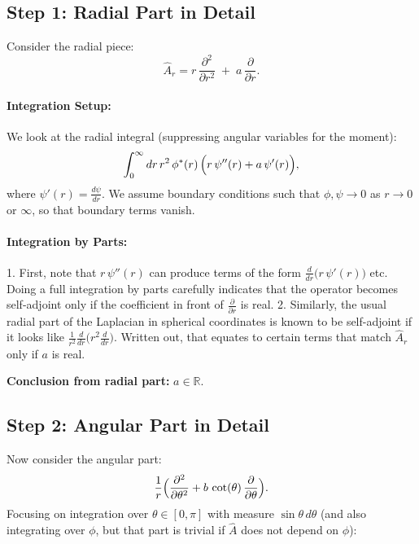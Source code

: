 \documentclass[12pt]{article}
\begin{document}
\subsection*{Step 1: Radial Part in Detail}
Consider the radial piece:
\begin{equation}
\hat{A}_r = r\,\frac{\partial^2}{\partial r^2} \;+\; a\,\frac{\partial}{\partial r}.
\end{equation}

\paragraph{Integration Setup:}
We look at the radial integral (suppressing angular variables for the moment):
\[
\int_0^{\infty} dr\, r^2\,\phi^*(r)\,\Bigl(r\,\psi''(r) + a\,\psi'(r)\Bigr),
\]
where \(\psi'(r) = \tfrac{d\psi}{dr}\). We assume boundary conditions such that \(\phi,\psi\to 0\) as \(r\to0\) or \(\infty\), so that boundary terms vanish.

\paragraph{Integration by Parts:}
1. First, note that \(r\,\psi''(r)\) can produce terms of the form \(\frac{d}{dr}\bigl(r\,\psi'(r)\bigr)\) etc. Doing a full integration by parts carefully indicates that the operator becomes self-adjoint only if the coefficient in front of \(\tfrac{\partial}{\partial r}\) is real.
2. Similarly, the usual radial part of the Laplacian in spherical coordinates is known to be self-adjoint if it looks like \(\frac{1}{r^2}\frac{d}{dr}\bigl(r^2\frac{d}{dr}\bigr)\). Written out, that equates to certain terms that match \(\hat{A}_r\) only if \(a\) is real.

\textbf{Conclusion from radial part:} \(a \in \mathbb{R}\).

\subsection*{Step 2: Angular Part in Detail}
Now consider the angular part:
\begin{equation}
\frac{1}{r}\Bigl(\frac{\partial^2}{\partial \theta^2} + b\,\cot(\theta)\,\frac{\partial}{\partial \theta}\Bigr).
\end{equation}
Focusing on integration over \(\theta\in[0,\pi]\) with measure \(\sin\theta\,d\theta\) (and also integrating over \(\phi\), but that part is trivial if \(\hat{A}\) does not depend on \(\phi\)):
\end{document}
